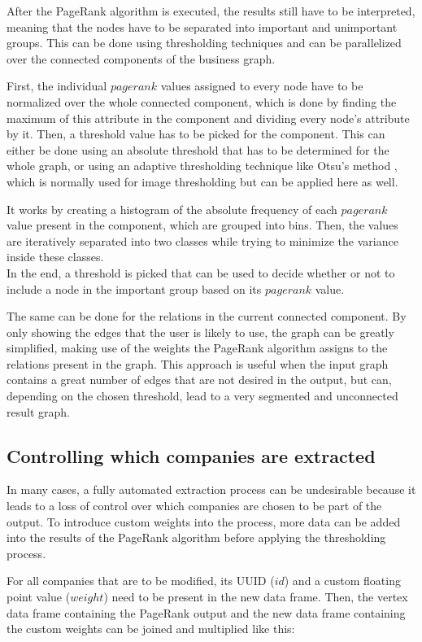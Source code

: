 \documentclass[
        a4paper,     %
        titlepage,   %
        oneside,     %
        parskip      %
        ]{scrartcl}  %
\begin{document}
  After the PageRank algorithm is executed, the results still have to be interpreted,
  meaning that the nodes have to be separated into important and unimportant groups.
  This can be done using thresholding techniques and can be parallelized
  over the connected components of the business graph.

  First, the individual $pagerank$ values assigned to every node have to be normalized
  over the whole connected component, which is done by finding the maximum of this
  attribute in the component and dividing every node's attribute by it.
  Then, a threshold value has to be picked for the component. This can either be done
  using an absolute threshold that has to be determined for the whole graph, or
  using an adaptive thresholding technique like Otsu's method \cite{otsu1979threshold},
  which is normally used for image thresholding but can be applied here as well.

  It works by creating a histogram of the absolute frequency of
  each $pagerank$ value present in the component, which are grouped into bins.
  Then, the values are iteratively separated into two classes while trying to
  minimize the variance inside these classes.\\
  In the end, a threshold is picked that can be used to decide whether or not to
  include a node in the important group based on its $pagerank$ value.

  The same can be done for the relations in the current connected component.
  By only showing the edges that the user is likely to use, the graph can be greatly
  simplified, making use of the weights the PageRank algorithm assigns to the
  relations present in the graph. This approach is useful when the input graph
  contains a great number of edges that are not desired in the output, but can,
  depending on the chosen threshold, lead to a very segmented and unconnected result graph.

  \subsection{Controlling which companies are extracted}
  In many cases, a fully automated extraction process can be undesirable because
  it leads to a loss of control over which companies are chosen to be part of the
  output. To introduce custom weights into the process, more data can be added
  into the results of the PageRank algorithm before applying the thresholding process.

  For all companies that are to be modified, its UUID ($id$) and a custom floating point
  value ($weight$) need to be present in the new data frame. Then, the vertex data frame containing
  the PageRank output and the new data frame containing the custom weights can be joined
  and multiplied like this:
\end{document}
